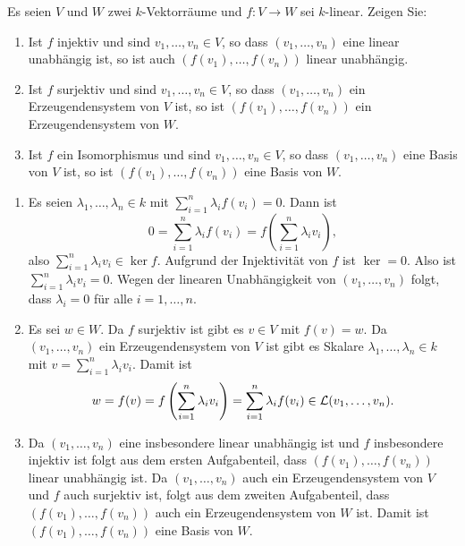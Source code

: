 \begin{question}
 Es seien $V$ und $W$ zwei $k$-Vektorräume und $f \colon V \to W$ sei $k$-linear. Zeigen Sie:
 \begin{enumerate}
  \item
   Ist $f$ injektiv und sind $v_1, \dotsc, v_n \in V$, so dass $(v_1, \dotsc, v_n)$ eine linear unabhängig ist, so ist auch $(f(v_1), \dotsc, f(v_n))$ linear unabhängig.
  \item
   Ist $f$ surjektiv und sind $v_1, \dotsc, v_n \in V$, so dass $(v_1, \dotsc, v_n)$ ein Erzeugendensystem von $V$ ist, so ist \mbox{$(f(v_1), \dotsc, f(v_n))$} ein Erzeugendensystem von $W$.
  \item
   Ist $f$ ein Isomorphismus und sind $v_1, \dotsc, v_n \in V$, so dass $(v_1, \dotsc, v_n)$ eine Basis von $V$ ist, so ist \mbox{$(f(v_1), \dotsc, f(v_n))$} eine Basis von $W$.
 \end{enumerate}
\end{question}
\begin{solution}
 \begin{enumerate}
  \item
   Es seien $\lambda_1, \dotsc, \lambda_n \in k$ mit $\sum_{i=1}^n \lambda_i f(v_i) = 0$. Dann ist
   \[
    0 = \sum_{i=1}^n \lambda_i f(v_i) = f\left( \sum_{i=1}^n \lambda_i v_i \right),
   \]
   also $\sum_{i=1}^n \lambda_i v_i \in \ker f$. Aufgrund der Injektivität von $f$ ist $\ker = 0$. Also ist $\sum_{i=1}^n \lambda_i v_i = 0$. Wegen der linearen Unabhängigkeit von $(v_1, \dotsc, v_n)$ folgt, dass $\lambda_i = 0$ für alle $i = 1, \dotsc, n$.
  \item
   Es sei $w \in W$. Da $f$ surjektiv ist gibt es $v \in V$ mit $f(v) = w$. Da $(v_1, \dotsc, v_n)$ ein Erzeugendensystem von $V$ ist gibt es Skalare $\lambda_1, \dotsc, \lambda_n \in k$ mit $v = \sum_{i=1}^n \lambda_i v_i$. Damit ist
   \[
    w
    = f(v)
    = f\left( \sum_{i=1}^n \lambda_i v_i \right)
    = \sum_{i=1}^n \lambda_i f(v_i)
    \in \mathcal{L}(v_1, \dotsc, v_n).
   \]
  \item
   Da $(v_1, \dotsc, v_n)$ eine insbesondere linear unabhängig ist und $f$ insbesondere injektiv ist folgt aus dem ersten Aufgabenteil, dass $(f(v_1), \dotsc, f(v_n))$ linear unabhängig ist. Da $(v_1, \dotsc, v_n)$ auch ein Erzeugendensystem von $V$ und $f$ auch surjektiv ist, folgt aus dem zweiten Aufgabenteil, dass $(f(v_1), \dotsc, f(v_n))$ auch ein Erzeugendensystem von $W$ ist. Damit ist $(f(v_1), \dotsc, f(v_n))$ eine Basis von $W$.
 \end{enumerate}

 

\end{solution}




